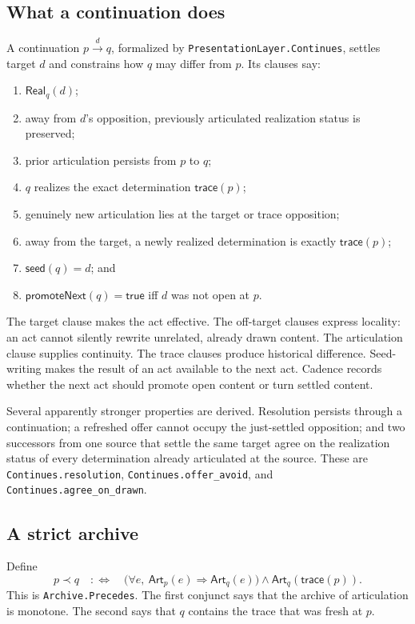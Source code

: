 \documentclass[11pt]{article}
\theoremstyle{definition}
\theoremstyle{remark}
\newcommand{\lean}[1]{\nolinkurl{#1}}
\newcommand{\Art}{\mathsf{Art}}
\newcommand{\Real}{\mathsf{Real}}
\newcommand{\Seed}{\mathsf{seed}}
\newcommand{\Trace}{\mathsf{trace}}
\newcommand{\Prom}{\mathsf{promoteNext}}
\begin{document}
\subsection{What a continuation does}

A continuation \(p\xrightarrow{d}q\), formalized by
\lean{PresentationLayer.Continues}, settles target \(d\) and constrains how
\(q\) may differ from \(p\). Its clauses say:

\begin{enumerate}[label=(C\arabic*)]
  \item \(\Real_q(d)\);
  \item away from \(d\)'s opposition, previously articulated realization
        status is preserved;
  \item prior articulation persists from \(p\) to \(q\);
  \item \(q\) realizes the exact determination \(\Trace(p)\);
  \item genuinely new articulation lies at the target or trace opposition;
  \item away from the target, a newly realized determination is exactly
        \(\Trace(p)\);
  \item \(\Seed(q)=d\); and
  \item \(\Prom(q)=\mathsf{true}\) iff \(d\) was not open at \(p\).
\end{enumerate}

The target clause makes the act effective. The off-target clauses express
locality: an act cannot silently rewrite unrelated, already drawn content.
The articulation clause supplies continuity. The trace clauses produce
historical difference. Seed-writing makes the result of an act available to
the next act. Cadence records whether the next act should promote open content
or turn settled content.

Several apparently stronger properties are derived. Resolution persists
through a continuation; a refreshed offer cannot occupy the just-settled
opposition; and two successors from one source that settle the same target
agree on the realization status of every determination already articulated at
the source. These are \lean{Continues.resolution},
\lean{Continues.offer_avoid}, and \lean{Continues.agree_on_drawn}.

\subsection{A strict archive}

Define
\[
  p\prec q
  \quad:\!\!\Longleftrightarrow\quad
  \bigl(\forall e,\ \Art_p(e)\Rightarrow\Art_q(e)\bigr)
  \land \Art_q(\Trace(p)).
\]
This is \lean{Archive.Precedes}. The first conjunct says that the archive of
articulation is monotone. The second says that \(q\) contains the trace that was
fresh at \(p\).
\end{document}
